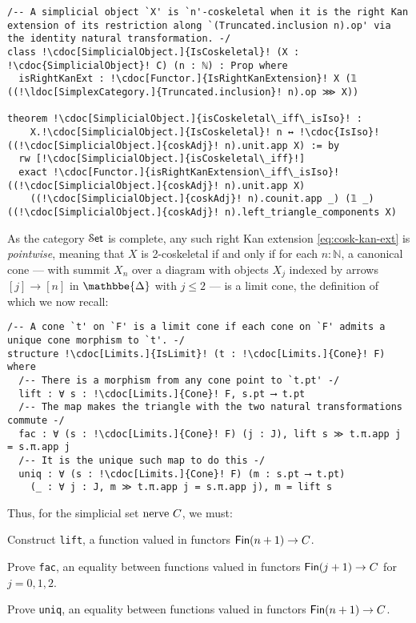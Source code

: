 \documentclass[a4paper,UKenglish,cleveref, autoref, thm-restate]{lipics-v2021}
\newcommand{\nerve}{\textup{nerve}}
\newcommand{\cat}[1]{\textup{\textsf{#1}}}%
\newcommand{\NN}{\mathbb{N}}
\newcommand{\1}{\mathbbe{1}}
\newcommand{\2}{\mathbbe{2}}
\newcommand{\3}{\mathbbe{3}}
\newcommand{\DDelta}{\mathbbe{\Delta}}
\newcommand{\Fin}{\cat{Fin}}
\newcommand{\Set}{\mathcal{S}\cat{et}}
\newcommand{\ldoc}[2][]{\href{https://leanprover-community.github.io/mathlib4_docs/find/?pattern=#1#2\#doc}{\texttt{#2}}}
\newcommand{\cdoc}[2][]{\href{https://leanprover-community.github.io/mathlib4_docs/find/?pattern=CategoryTheory.#1#2\#doc}{\texttt{#2}}}
\begin{document}
\begin{lstlisting}
/-- A simplicial object `X' is `n'-coskeletal when it is the right Kan extension of its restriction along `(Truncated.inclusion n).op' via the identity natural transformation. -/
class !\cdoc[SimplicialObject.]{IsCoskeletal}! (X : !\cdoc{SimplicialObject}! C) (n : ℕ) : Prop where
  isRightKanExt : !\cdoc[Functor.]{IsRightKanExtension}! X (𝟙 ((!\ldoc[SimplexCategory.]{Truncated.inclusion}! n).op ⋙ X))

theorem !\cdoc[SimplicialObject.]{isCoskeletal\_iff\_isIso}! :
    X.!\cdoc[SimplicialObject.]{IsCoskeletal}! n ↔ !\cdoc{IsIso}! ((!\cdoc[SimplicialObject.]{coskAdj}! n).unit.app X) := by
  rw [!\cdoc[SimplicialObject.]{isCoskeletal\_iff}!]
  exact !\cdoc[Functor.]{isRightKanExtension\_iff\_isIso}! ((!\cdoc[SimplicialObject.]{coskAdj}! n).unit.app X)
    ((!\cdoc[SimplicialObject.]{coskAdj}! n).counit.app _) (𝟙 _) ((!\cdoc[SimplicialObject.]{coskAdj}! n).left_triangle_components X)
\end{lstlisting}
As the category $\Set$ is complete, any such right Kan extension \eqref{eq:cosk-kan-ext} is \emph{pointwise}, meaning that $X$ is 2-coskeletal if and only if for each $n : \NN$, a canonical cone --- with summit $X_n$ over a diagram with objects $X_j$ indexed by arrows $[j] \to [n]$ in $\DDelta$ with $j \leq 2$ --- is a limit cone, the definition of which we now recall:
\begin{lstlisting}
/-- A cone `t' on `F' is a limit cone if each cone on `F' admits a unique cone morphism to `t'. -/
structure !\cdoc[Limits.]{IsLimit}! (t : !\cdoc[Limits.]{Cone}! F) where
  /-- There is a morphism from any cone point to `t.pt' -/
  lift : ∀ s : !\cdoc[Limits.]{Cone}! F, s.pt ⟶ t.pt
  /-- The map makes the triangle with the two natural transformations commute -/
  fac : ∀ (s : !\cdoc[Limits.]{Cone}! F) (j : J), lift s ≫ t.π.app j = s.π.app j
  /-- It is the unique such map to do this -/
  uniq : ∀ (s : !\cdoc[Limits.]{Cone}! F) (m : s.pt ⟶ t.pt)
    (_ : ∀ j : J, m ≫ t.π.app j = s.π.app j), m = lift s
\end{lstlisting}
Thus, for the simplicial set $\nerve\ C$, we must:
\begin{romanenumerate}
\item Construct \texttt{lift}, a function valued in functors $\Fin(n + 1) \to C$.
\item Prove \texttt{fac}, an equality between functions valued in functors $\Fin(j + 1) \to C$ for $j = 0, 1, 2$.
\item Prove \texttt{uniq}, an equality between functions valued in functors $\Fin(n + 1) \to C$.
\end{romanenumerate}
\end{document}
